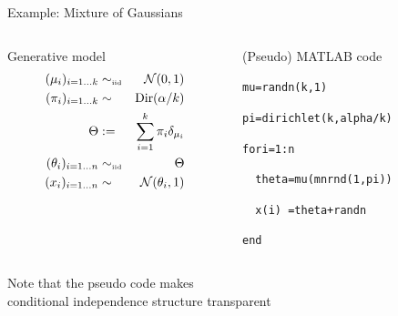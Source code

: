 \begin{frame}{Example: Mixture of Gaussians}
  \begin{columns}
    \begin{column}{.47\textwidth}
      \begin{block}{Generative model}
        \begin{eqnarray*}
          (\mu_i)_{i=1\ldots k} & \sim_{\mbox{\tiny iid}} & \mathcal{N}(0, 1) \\
          (\pi_i)_{i=1\ldots k} & \sim & \textrm{Dir}(\alpha/k) \\
          \Theta & := & \sum_{i=1}^k \pi_i \delta_{\mu_i} \\
          (\theta_i)_{i=1\ldots n} & \sim_{\mbox{\tiny iid}} & \Theta \\
          (x_i)_{i=1\ldots n} & \sim & \mathcal{N}(\theta_i, 1)
        \end{eqnarray*}
      \end{block}
    \end{column}
    \begin{column}{.47\textwidth}
      \begin{block}{(Pseudo) MATLAB code}
        \vspace{0.75\baselineskip}
        \begin{alltt}
          mu = randn(k,1)

          pi = dirichlet(k, alpha/k)

          for i = 1:n
            
          \ \ theta = mu(mnrnd(1,pi))
          
          \ \ x(i) \ = theta + randn
            
          end
        \end{alltt}
        \vspace{0.75\baselineskip}
      \end{block}
    \end{column}
  \end{columns}
  \vspace{\baselineskip}
  \begin{center}
  {
    {Note that the pseudo code makes\\conditional independence structure transparent}
  }	
  \end{center}
  \vspace{-1\baselineskip}
\end{frame}

